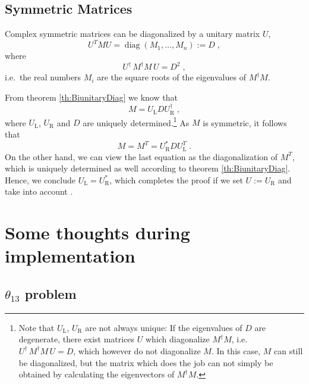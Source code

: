 \documentclass[12pt,a4paper,twoside]{scrartcl}
\DeclareMathOperator{\diag}{diag}
\numberwithin{equation}{section}
\numberwithin{table}{section}
\begin{document}
\subsection*{Symmetric Matrices}
\begin{Theorem} \label{th:SymmetricMatrixDiag}
 Complex symmetric matrices can be diagonalized by a unitary matrix $U$,
 \begin{equation}
        U^T M U = \diag(M_1,\dots,M_n) := D \;,
 \end{equation}
 where
 \begin{equation}
        U^\dagger \, M^\dagger M \, U = D^2 \;,
 \end{equation}
 i.e.\ the real numbers $M_i$ are the square roots of the eigenvalues of
 $M^\dagger M$.
\end{Theorem}
\begin{Proof}
 From theorem \ref{th:BiunitaryDiag} we know that 
 \begin{equation}
        M = U_\mathrm{L} D U_\mathrm{R}^\dagger \;,
 \end{equation}
 where $U_\mathrm{L}$, $U_\mathrm{R}$ and $D$ are uniquely 
 determined.\footnote{Note that $U_\mathrm{L}$, $U_\mathrm{R}$ are
 not always unique: If the eigenvalues
 of $D$ are degenerate, there exist matrices $U$ which diagonalize
 $M^\dagger M$, i.e. $U^\dagger\,M^\dagger M\, U=D$, which however
 do not diagonalize $M$. In this case, $M$ can still be diagonalized,
 but the matrix which does the job can not simply be obtained by calculating
 the eigenvectors of $M^\dagger M$.}
 As $M$ is symmetric, it follows that
 \begin{equation}
        M = M^T = U_\mathrm{R}^* D U_\mathrm{L}^T \;.
 \end{equation}
 On the other hand, we can view the last equation as the diagonalization
 of $M^T$, which is uniquely determined as well according to theorem
 \ref{th:BiunitaryDiag}.  Hence, we conclude 
 $U_\mathrm{L}=U_\mathrm{R}^*$, which completes the proof if we set
 $U:=U_\mathrm{R}$ and take into account .
\end{Proof}

\section{Some thoughts during implementation}

\subsection*{$\theta_{13}$ problem}
\end{document}

